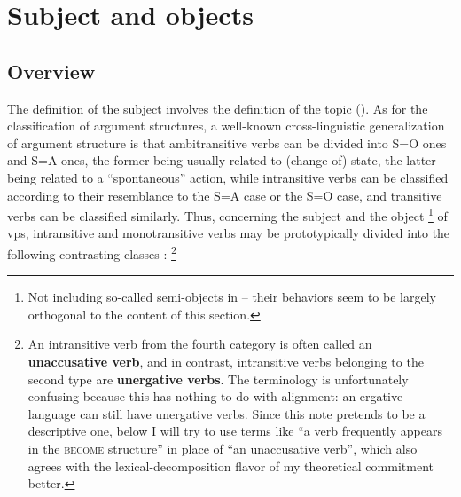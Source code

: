 \documentclass[UTF8, a4paper, oneside, scheme=plain, 12pt]{ctexrep}
\newcommand*{\citechap}[1]{chap.~{#1}}
\newcommand*{\concept}[1]{\textbf{#1}}
\newcommand*{\category}[1]{\textsc{#1}}
\begin{document}
\section{Subject and objects}

\subsection{Overview}

The definition of the subject involves the definition of the topic
().
As for the classification of argument structures, 
a well-known cross-linguistic generalization of argument structure 
is that ambitransitive verbs can be divided into S=O ones 
and S=A ones, 
the former being usually related to (change of) state, 
the latter being related to a ``spontaneous'' action, 
while intransitive verbs can be classified according to their 
resemblance to the S=A case or the S=O case, 
and transitive verbs can be classified similarly. 
Thus, concerning the subject and the object%
\footnote{
    Not including so-called semi-objects in 
    -- their behaviors seem to be largely orthogonal to the content of this section.
}
of \acs{vp}s, 
intransitive and monotransitive verbs
may be prototypically divided into the following contrasting classes 
\citep[\citechap{6}]{deng2010formal}:%
\footnote{
    An intransitive verb from the fourth category
    is often called an \concept{unaccusative verb}, 
    and in contrast, 
    intransitive verbs belonging to the second type 
    are \concept{unergative verbs}.
    The terminology is unfortunately confusing
    because this has nothing to do with alignment:
    an ergative language can still have unergative verbs.
    Since this note pretends to be a descriptive one, 
    below I will try to use terms like ``a verb frequently appears in the \category{become} structure''
    in place of ``an unaccusative verb'',
    which also agrees with the lexical-decomposition flavor of 
    my theoretical commitment better. 
}
\end{document}
